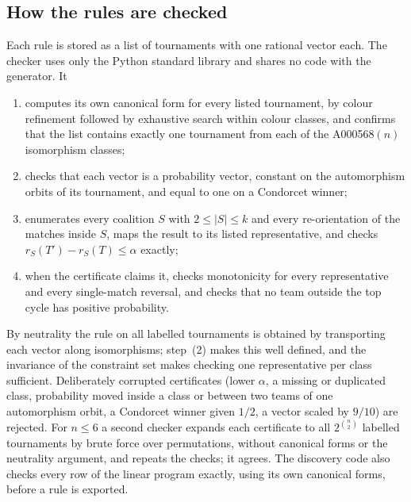 \documentclass[11pt]{amsart}
\theoremstyle{definition}
\theoremstyle{remark}
\begin{document}
\subsection*{How the rules are checked}
Each rule is stored as a list of tournaments with one rational vector each. The checker uses only the Python standard library and shares no code with the generator. It
\begin{enumerate}
\item computes its own canonical form for every listed tournament, by colour refinement followed by exhaustive search within colour classes, and confirms that the list contains exactly one tournament from each of the A000568$(n)$ isomorphism classes;
\item checks that each vector is a probability vector, constant on the automorphism orbits of its tournament, and equal to one on a Condorcet winner;
\item enumerates every coalition $S$ with $2\le|S|\le k$ and every re-orientation of the matches inside $S$, maps the result to its listed representative, and checks $r_S(T')-r_S(T)\le\alpha$ exactly;
\item when the certificate claims it, checks monotonicity for every representative and every single-match reversal, and checks that no team outside the top cycle has positive probability.
\end{enumerate}
By neutrality the rule on all labelled tournaments is obtained by transporting each vector along isomorphisms; step~(2) makes this well defined, and the invariance of the constraint set makes checking one representative per class sufficient. Deliberately corrupted certificates (lower $\alpha$, a missing or duplicated class, probability moved inside a class or between two teams of one automorphism orbit, a Condorcet winner given $1/2$, a vector scaled by $9/10$) are rejected. For $n\le6$ a second checker expands each certificate to all $2^{\binom n2}$ labelled tournaments by brute force over permutations, without canonical forms or the neutrality argument, and repeats the checks; it agrees. The discovery code also checks every row of the linear program exactly, using its own canonical forms, before a rule is exported.
\end{document}
